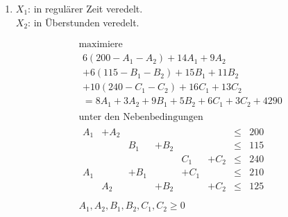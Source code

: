 \documentclass[a4paper]{scrartcl}
\begin{document}
\begin{enumerate}[label=\bfseries\arabic*.]
\begin{enumerate}
            \item
                $X_1$: in regulärer Zeit veredelt. \\
                $X_2$: in Überstunden veredelt.

                \begin{equation}
                    \begin{gathered}
                        \text{maximiere} \\
                        \begin{gathered}
                            6(200 -A_1 -A_2) + 14A_1 +9A_2 \\
                            + 6(115 -B_1 -B_2) + 15B_1 +11B_2 \\
                            + 10(240 -C_1 -C_2) + 16C_1 +13C_2 \\
                            = 8A_1 +3A_2 +9B_1 +5B_2 +6C_1 +3C_2 +4290
                        \end{gathered} \\
                        \text{unter den Nebenbedingungen} \\
                        \begin{array}{rrrrrrcr}
                            A_1 & +A_2 & & & & &  \leq & 200 \\
                            & & B_1 & +B_2 & & &  \leq & 115 \\
                            & & & & C_1 & +C_2 &  \leq & 240 \\
                            A_1 & & +B_1 & & +C_1 & &  \leq & 210 \\
                            & A_2 & & +B_2 & & +C_2 &  \leq & 125 \\
                        \end{array} \\
                        A_1, A_2, B_1, B_2, C_1, C_2 \geq 0
                    \end{gathered}
                \end{equation}

        \end{enumerate}

\end{enumerate}
\end{document}
